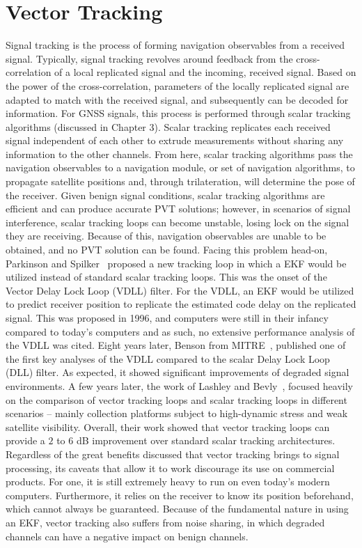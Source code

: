 \section{\textbf{Vector Tracking}}
Signal tracking is the process of forming navigation observables from a received signal. Typically, signal tracking revolves around feedback from the cross-correlation of a local replicated signal and the incoming, received signal. Based on the power of the cross-correlation, parameters of the locally replicated signal are adapted to match with the received signal, and subsequently can be decoded for information. For GNSS signals, this process is performed through scalar tracking algorithms (discussed in Chapter 3). Scalar tracking replicates each received signal independent of each other to extrude measurements without sharing any information to the other channels. From here, scalar tracking algorithms pass the navigation observables to a navigation module, or set of navigation algorithms, to propagate satellite positions and, through trilateration, will determine the pose of the receiver. Given benign signal conditions, scalar tracking algorithms are efficient and can produce accurate PVT solutions; however, in scenarios of signal interference, scalar tracking loops can become unstable, losing lock on the signal they are receiving. Because of this, navigation observables are unable to be obtained, and no PVT solution can be found.
Facing this problem head-on, Parkinson and Spilker~\cite{bradfordparkinsonGlobalPositioningSystem1996} proposed a new tracking loop in which a EKF would be utilized instead of standard scalar tracking loops. This was the onset of the Vector Delay Lock Loop (VDLL) filter. For the VDLL, an EKF would be utilized to predict receiver position to replicate the estimated code delay on the replicated signal. This was proposed in 1996, and computers were still in their infancy compared to today's computers and as such, no extensive performance analysis of the VDLL was cited.
Eight years later, Benson from MITRE~\cite{bensonInterferenceBenefitsVector}, published one of the first key analyses of the VDLL compared to the scalar Delay Lock Loop (DLL) filter. As expected, it showed significant improvements of degraded signal environments. A few years later, the work of Lashley and Bevly~\cite{lashleyPerformanceAnalysisVector2009,edwardsImplementationDetailsDeeply2010,matthewlashelyModelingPerformanceAnalysis2009}, focused heavily on the comparison of vector tracking loops and scalar tracking loops in different scenarios {--} mainly collection platforms subject to high-dynamic stress and weak satellite visibility. Overall, their work showed that vector tracking loops can provide a \(2\) to \(6\) dB improvement over standard scalar tracking architectures.
Regardless of the great benefits discussed that vector tracking brings to signal processing, its caveats that allow it to work discourage its use on commercial products. For one, it is still extremely heavy to run on even today's modern computers. Furthermore, it relies on the receiver to know its position beforehand, which cannot always be guaranteed. Because of the fundamental nature in using an EKF, vector tracking also suffers from noise sharing, in which degraded channels can have a negative impact on benign channels.

